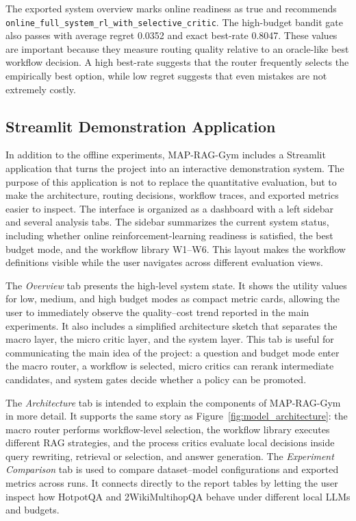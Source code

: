 \documentclass[12pt,a4paper]{article}
\begin{document}
The exported system overview marks online readiness as true and recommends \texttt{online\_full\_system\_rl\_with\_selective\_critic}. The high-budget bandit gate also passes with average regret 0.0352 and exact best-rate 0.8047. These values are important because they measure routing quality relative to an oracle-like best workflow decision. A high best-rate suggests that the router frequently selects the empirically best option, while low regret suggests that even mistakes are not extremely costly.

\subsection{Streamlit Demonstration Application}

In addition to the offline experiments, MAP-RAG-Gym includes a Streamlit application that turns the project into an interactive demonstration system. The purpose of this application is not to replace the quantitative evaluation, but to make the architecture, routing decisions, workflow traces, and exported metrics easier to inspect. The interface is organized as a dashboard with a left sidebar and several analysis tabs. The sidebar summarizes the current system status, including whether online reinforcement-learning readiness is satisfied, the best budget mode, and the workflow library W1--W6. This layout makes the workflow definitions visible while the user navigates across different evaluation views.

The \textit{Overview} tab presents the high-level system state. It shows the utility values for low, medium, and high budget modes as compact metric cards, allowing the user to immediately observe the quality--cost trend reported in the main experiments. It also includes a simplified architecture sketch that separates the macro layer, the micro critic layer, and the system layer. This tab is useful for communicating the main idea of the project: a question and budget mode enter the macro router, a workflow is selected, micro critics can rerank intermediate candidates, and system gates decide whether a policy can be promoted.

The \textit{Architecture} tab is intended to explain the components of MAP-RAG-Gym in more detail. It supports the same story as Figure~\ref{fig:model_architecture}: the macro router performs workflow-level selection, the workflow library executes different RAG strategies, and the process critics evaluate local decisions inside query rewriting, retrieval or selection, and answer generation. The \textit{Experiment Comparison} tab is used to compare dataset--model configurations and exported metrics across runs. It connects directly to the report tables by letting the user inspect how HotpotQA and 2WikiMultihopQA behave under different local LLMs and budgets.
\end{document}
